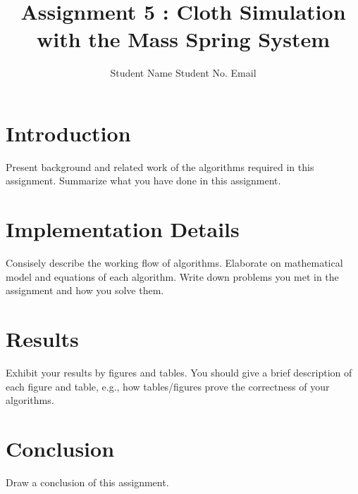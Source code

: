 \documentclass[acmtog]{acmart}
\title{Assignment 5 : Cloth Simulation with the Mass Spring System}
\author{Student Name \quad Student No. \quad Email}
\begin{document}
\maketitle

\vspace*{2 ex}


\section{Introduction}

Present background and related work of the algorithms required in this assignment. Summarize what you have done in this assignment.

\section{Implementation Details}

Consisely describe the working flow of algorithms. Elaborate on mathematical model and equations of each algorithm. Write down problems you met in the assignment and how you solve them.

\section{Results}

Exhibit your results by figures and tables. You should give a brief description of each figure and table, e.g., how tables/figures prove the correctness of your algorithms.

\section{Conclusion}

Draw a conclusion of this assignment.
\end{document}
